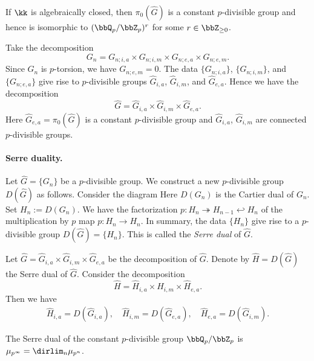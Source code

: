 If $\kk$ is algebraically closed, then $\pi_0(\hat{G})$ is a constant $p$-divisible group and hence is isomorphic to $(\bbQ_p/\bbZ_p)^r$ for some $r \in \bbZ_{\ge 0}$.

Take the decomposition
\[ G_n = G_{n;i,a} \times G_{n;i,m} \times G_{n;e,a} \times G_{n;e,m}. \]
Since $G_n$ is $p$-torsion, we have $G_{n;e,m} = 0$.
The data $\{G_{n;i,a}\}$, $\{G_{n;i,m}\}$, and $\{G_{n;e,a}\}$ give rise to $p$-divisible groups $\hat{G}_{i,a}$, $\hat{G}_{i,m}$, and $\hat{G}_{e,a}$.
Hence we have the decomposition
\[ \hat{G} = \hat{G}_{i,a} \times \hat{G}_{i,m} \times \hat{G}_{e,a}. \]
Here $\hat{G}_{e,a} = \pi_0(\hat{G})$ is a constant $p$-divisible group and $\hat{G}_{i,a}$, $\hat{G}_{i,m}$ are connected $p$-divisible groups.

\paragraph{Serre duality.} Let $\hat{G} = \{G_n\}$ be a $p$-divisible group.
We construct a new $p$-divisible group $D(\hat{G})$ as follows.
Consider the diagram
Here $D(G_n)$ is the Cartier dual of $G_n$.
Set $H_n := D(G_n)$.
We have the factorization $p:H_n \twoheadrightarrow H_{n-1} \hookleftarrow H_n$ of the multiplication by $p$ map $p:H_n \to H_n$.
\Yang{}
In summary, the data $\{H_n\}$ give rise to a $p$-divisible group $D(\hat{G}) = \{H_n\}$.
This is called the \emph{Serre dual} of $\hat{G}$.

Let $\hat{G} = \hat{G}_{i,a} \times \hat{G}_{i,m} \times \hat{G}_{e,a}$ be the decomposition of $\hat{G}$.
Denote by $\hat{H} = D(\hat{G})$ the Serre dual of $\hat{G}$.
Consider the decomposition
\[ \hat{H} = \hat{H}_{i,a} \times \hat{H}_{i,m} \times \hat{H}_{e,a}. \]
Then we have
\begin{align*}
	\hat{H}_{i,a} = D(\hat{G}_{i,a}),\quad \hat{H}_{i,m} = D(\hat{G}_{e,a}), \quad \hat{H}_{e,a} = D(\hat{G}_{i,m}).
\end{align*}

\begin{example}
	The Serre dual of the constant $p$-divisible group $\bbQ_p/\bbZ_p$ is $\mu_{p^\infty} = \dirlim_n \mu_{p^n}$.
\end{example}

